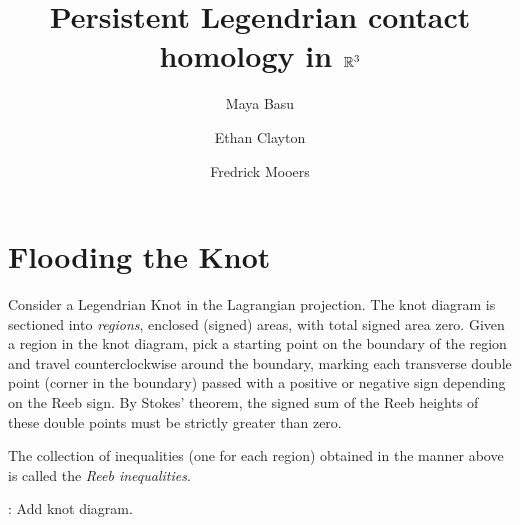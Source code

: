 \documentclass[11pt,oneside]{amsart}
\begin{document}
\author{Maya Basu}
\author{Ethan Clayton}
\author{Fredrick Mooers}

\address{University of California, Berkeley}

\address{University of Illinois, Urbana-Champaign}

\address{Virginia Tech}

\title{Persistent Legendrian contact homology in $\mathbb R^3$}




\maketitle

\tableofcontents
\newpage

\section{Flooding the Knot}

Consider a Legendrian Knot in the Lagrangian projection. The knot diagram is sectioned into \textit{regions}, enclosed (signed) areas, with total signed area zero. Given a region in the knot diagram, pick a starting point on the boundary of the region and travel counterclockwise around the boundary, marking each transverse double point (corner in the boundary) passed with a positive or negative sign depending on the Reeb sign. By Stokes' theorem, the signed sum of the Reeb heights of these double points must be strictly greater than zero.

\begin{definition}
\label{def:ReebIneq}
The collection of inequalities (one for each region) obtained in the manner above is called the \textit{Reeb inequalities}.
\end{definition}

\begin{example}
\TODO: Add knot diagram.
    
\end{example}
\end{document}
